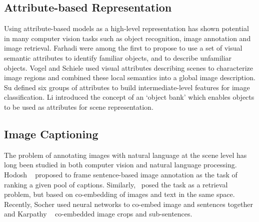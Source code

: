 \subsection{Attribute-based Representation} Using attribute-based models as a high-level representation has shown potential in many computer vision tasks such as object recognition, image annotation and image retrieval. Farhadi \etal \cite{farhadi2009describing} were
among the first to propose to use a set of visual semantic attributes to identify familiar objects, and to describe unfamiliar objects. %
Vogel and Schiele \cite{vogel2007semantic} used visual attributes describing scenes to characterize image regions and combined these local semantics into a global image description. Su \etal \cite{su2012improving} defined six groups of attributes to build intermediate-level features for image classification. Li \etal \cite{li2010object,li2012objects} introduced the concept of an `object bank' which enables objects to be used as attributes for scene representation.

\subsection{Image Captioning} The problem of annotating images with natural language at the scene level has long been studied in both computer vision and natural language processing. Hodosh \etal~\cite{hodosh2013framing} proposed to frame sentence-based image annotation as the task of ranking a given pool of captions. Similarly,~\cite{gong2014improving,jia2011learning,ordonez2011im2text} posed the task as a retrieval problem, but based on co-embedding of images and text in the same space. Recently, Socher \etal \cite{socher2014grounded} used neural networks to co-embed image and sentences together and Karpathy \etal~\cite{karpathy2014deep} co-embedded image crops and sub-sentences. %

